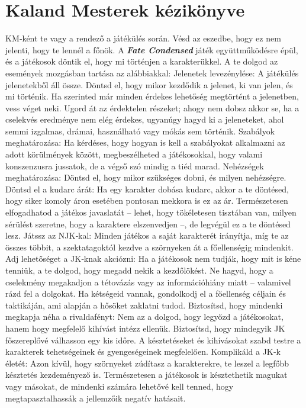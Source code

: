 \documentclass[oneside]{book}
\newcommand{\fate}[1]{\textbf{\textit{#1}}}
\begin{document}
\chapter{Kaland Mesterek kézikönyve}
KM‑ként te vagy a rendező a játékülés során. Vésd az eszedbe, hogy ez nem jelenti, hogy te lennél a főnök. A \fate{Fate Condensed} játék együttműködésre épül, és a játékosok döntik el, hogy mi történjen a karakterükkel. A te dolgod az események mozgásban tartása az alábbiakkal:
Jelenetek levezénylése: A játékülés jelenetekből áll össze. Döntsd el, hogy mikor kezdődik a jelenet, ki van jelen, és mi történik. Ha szerinted már minden érdekes lehetőség megtörtént a jelenetben, vess véget neki. Ugord át az érdektelen részeket; ahogy nem dobsz akkor se, ha a cselekvés eredménye nem elég érdekes, ugyanúgy hagyd ki a jeleneteket, ahol semmi izgalmas, drámai, használható vagy mókás sem történik.
Szabályok meghatározása: Ha kérdéses, hogy hogyan is kell a szabályokat alkalmazni az adott körülmények között, megbeszélheted a játékosokkal, hogy valami konszenzusra jussatok, de a végső szó mindig a tiéd marad.
Nehézségek meghatározása: Döntsd el, hogy mikor szükséges dobni, és milyen nehézségre.
Döntsd el a kudarc árát: Ha egy karakter dobása kudarc, akkor a te döntésed, hogy siker komoly áron esetében pontosan mekkora is ez az ár. Természetesen elfogadhatod a játékos javaslatát – lehet, hogy tökéletesen tisztában van, milyen sérülést szeretne, hogy a karaktere elszenvedjen –, de legvégül ez a te döntésed lesz.
Játssz az NJK‑kal: Minden játékos a saját karakterét irányítja, míg te az összes többit, a szektatagoktól kezdve a szörnyeken át a főellenségig mindenkit.
Adj lehetőséget a JK‑knak akciózni: Ha a játékosok nem tudják, hogy mit is kéne tenniük, a te dolgod, hogy megadd nekik a kezdőlökést. Ne hagyd, hogy a cselekmény megakadjon a tétovázás vagy az információhiány miatt – valamivel rázd fel a dolgokat. Ha kétségeid vannak, gondolkodj el a főellenség  céljain és taktikáján, ami alapján a hősöket zaklatni tudod.
Biztosítsd, hogy mindenki megkapja néha a rivaldafényt: Nem az a dolgod, hogy legyőzd a játékosokat, hanem hogy megfelelő kihívást intézz ellenük. Biztosítsd, hogy mindegyik JK főszereplővé válhasson egy kis időre. A késztetéseket és kihívásokat szabd testre a karakterek tehetségeinek és gyengeségeinek megfelelően.
Komplikáld a JK‑k életét: Azon kívül, hogy szörnyeket zúdítasz a karakterekre, te leszel a legfőbb késztetés kezdeményező is. Természetesen a játékosok is késztethetik magukat vagy másokat, de mindenki számára lehetővé kell tenned, hogy megtapasztalhassák a jellemzőik negatív hatásait.
\end{document}
